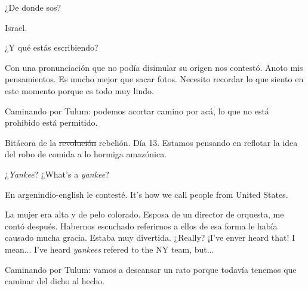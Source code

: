 \documentclass[12pt,twoside,openright,a5paper]{book}
\begin{document}
¿De donde sos?

Israel.

¿Y qué estás escribiendo?

Con una pronunciación que no podía disimular su origen nos contestó. Anoto
mis pensamientos. Es mucho mejor que sacar fotos. Necesito recordar lo que
siento en este momento porque es todo muy lindo.


\vspace{0.5cm}
\hrulefill\hspace{0.2cm} \decofourleft\decofourright \hspace{0.2cm} \hrulefill
\vspace{0.5cm}

Caminando por Tulum: podemos acortar camino por acá, lo que no está
prohibido está permitido.


\vspace{0.5cm}
\hrulefill\hspace{0.2cm} \decofourleft\decofourright \hspace{0.2cm} \hrulefill
\vspace{0.5cm}

Bitácora de la \st{revolución} rebelión. Día 13. Estamos pensando en reflotar la idea
del robo de comida a lo hormiga amazónica.


\vspace{0.5cm}
\hrulefill\hspace{0.2cm} \decofourleft\decofourright \hspace{0.2cm} \hrulefill
\vspace{0.5cm}

¿\emph{Yankee}? ¿What's a \emph{yankee}?

En argenindio-english le contesté. It's how we call people from United States.

La mujer era alta y de pelo colorado. Esposa de un director de orquesta, me contó después. Habernos escuchado referirnos a ellos de esa forma le había causado mucha gracia. Estaba muy divertida. ¿Really? ¡I've enver heard that! I mean... I've heard \emph{yankees} refered to the NY team, but...


\vspace{0.5cm}
\hrulefill\hspace{0.2cm} \decofourleft\decofourright \hspace{0.2cm} \hrulefill
\vspace{0.5cm}

Caminando por Tulum: vamos a descansar un rato porque todavía tenemos que
caminar del dicho al hecho.
\end{document}
